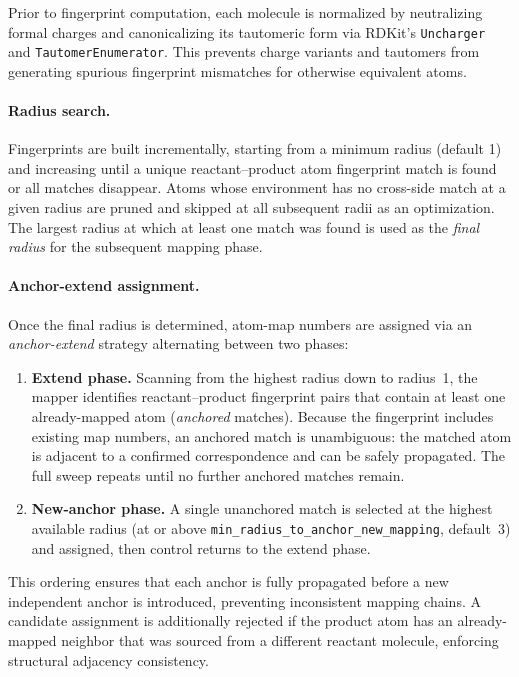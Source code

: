\documentclass[12pt]{article}
\begin{document}
Prior to fingerprint computation, each molecule is normalized by neutralizing
formal charges and canonicalizing its tautomeric form via RDKit's
\texttt{Uncharger} and \texttt{TautomerEnumerator}.  This prevents charge
variants and tautomers from generating spurious fingerprint mismatches for
otherwise equivalent atoms.

\paragraph{Radius search.}
Fingerprints are built incrementally, starting from a minimum radius
(default 1) and increasing until a unique reactant--product atom fingerprint
match is found or all matches disappear.  Atoms whose environment has no
cross-side match at a given radius are pruned and skipped at all subsequent
radii as an optimization.  The largest radius at which at least
one match was found is used as the \emph{final radius} for the subsequent
mapping phase.

\paragraph{Anchor-extend assignment.}
Once the final radius is determined, atom-map numbers are assigned via an
\emph{anchor-extend} strategy alternating between two phases:

\begin{enumerate}[leftmargin=*, label=(\arabic*)]
  \item \textbf{Extend phase.}  Scanning from the highest radius down to
        radius~1, the mapper identifies reactant--product fingerprint pairs that
        contain at least one already-mapped atom (\emph{anchored} matches).
        Because the fingerprint includes existing map numbers, an anchored match
        is unambiguous: the matched atom is adjacent to a confirmed
        correspondence and can be safely propagated.  The full sweep repeats
        until no further anchored matches remain.
  \item \textbf{New-anchor phase.}  A single unanchored match is selected at
        the highest available radius (at or above
        \texttt{min\_radius\_to\_anchor\_new\_mapping}, default~3) and assigned,
        then control returns to the extend phase.
\end{enumerate}

This ordering ensures that each anchor is fully propagated before a new
independent anchor is introduced, preventing inconsistent mapping chains.  A
candidate assignment is additionally rejected if the product atom has an
already-mapped neighbor that was sourced from a different reactant molecule,
enforcing structural adjacency consistency.
\end{document}
